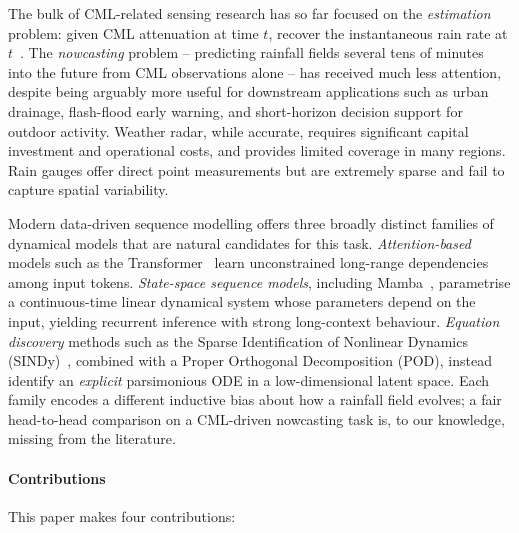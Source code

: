 \documentclass[conference]{IEEEtran}
\begin{document}
The bulk of CML-related sensing research has so far focused on the
\emph{estimation} problem: given CML attenuation at time $t$, recover
the instantaneous rain rate at $t$~\cite{habi2020,zhang2023environment,chwala2019}. The
\emph{nowcasting} problem -- predicting rainfall fields several tens of
minutes into the future from CML observations alone -- has received much
less attention, despite being arguably more useful for downstream
applications such as urban drainage, flash-flood early warning, and
short-horizon decision support for outdoor activity. Weather radar, while accurate, requires significant capital investment and operational costs, and provides limited coverage in many regions. Rain gauges offer direct point measurements but are extremely sparse and fail to capture spatial variability.

Modern data-driven sequence modelling offers three broadly distinct
families of dynamical models that are natural candidates for this task.
\emph{Attention-based} models such as the
Transformer~\cite{vaswani2017} learn unconstrained long-range
dependencies among input tokens. \emph{State-space sequence models},
including Mamba~\cite{gu2023mamba}, parametrise a continuous-time linear
dynamical system whose parameters depend on the input, yielding
recurrent inference with strong long-context behaviour. \emph{Equation
discovery} methods such as the Sparse Identification of Nonlinear
Dynamics (SINDy)~\cite{brunton2016sindy}, combined with a Proper
Orthogonal Decomposition (POD), instead identify an \emph{explicit}
parsimonious ODE in a low-dimensional latent space. Each family encodes
a different inductive bias about how a rainfall field evolves; a fair
head-to-head comparison on a CML-driven nowcasting task is, to our
knowledge, missing from the literature.

\paragraph*{Contributions} This paper makes four contributions:
\end{document}

